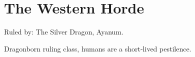 \section{The Western Horde}

Ruled by: The Silver Dragon, Ayanum.

Dragonborn ruling class, humans are a short-lived pestilence.
